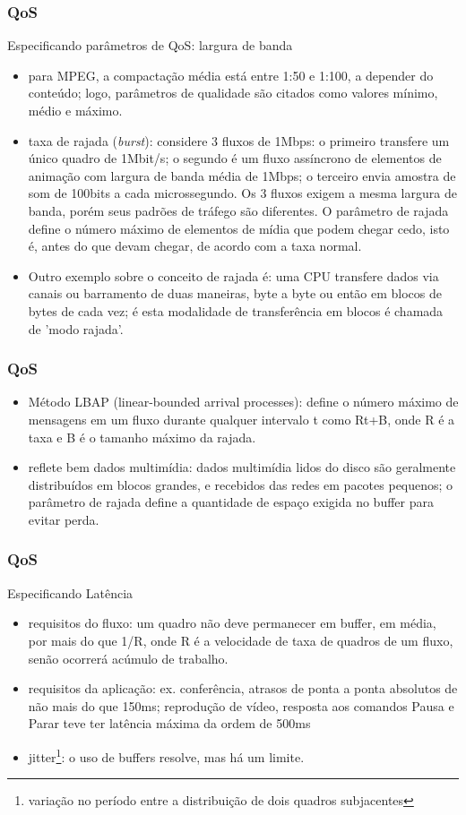 \documentclass[]{beamer}
\begin{document}
\begin{frame}[allowframebreaks]
  \frametitle{QoS}
Especificando parâmetros de QoS: largura de banda
\begin{itemize}
  \item  para MPEG, a compactação média está entre 1:50 e 1:100, a depender
do conteúdo; logo, parâmetros de qualidade são 
citados como valores mínimo, médio e máximo.
  \item taxa de rajada 
(\emph{burst}): considere 3 fluxos de 1Mbps: o primeiro 
transfere um único quadro de 1Mbit/s;
o segundo é um fluxo assíncrono de elementos de animação
com largura de banda média de 1Mbps; o terceiro envia amostra de 
som de 100bits a cada microssegundo. 
Os 3 fluxos exigem a mesma largura de banda, porém
seus padrões de tráfego são diferentes. 
O parâmetro de rajada define o número máximo de 
elementos de mídia que podem chegar cedo, 
isto é, antes do que devam chegar, de acordo
com a taxa normal.
 \item Outro exemplo sobre o conceito de rajada é: 
 uma CPU transfere dados via canais ou barramento 
de duas maneiras, byte a byte ou então em blocos de bytes de cada vez; 
é esta modalidade de transferência em blocos é 
chamada de 'modo rajada'.\cite{site1:2011}
\end{itemize}
\end{frame}


\begin{frame}
  \frametitle{QoS}
\begin{itemize}
  \item %
Método LBAP (linear-bounded arrival processes): 
define o número máximo de mensagens em um fluxo durante qualquer intervalo t como Rt+B,
onde R é a taxa e B é o tamanho máximo da rajada.
  \item reflete bem dados multimídia: dados multimídia lidos do disco são geralmente 
distribuídos em blocos grandes,
e recebidos das redes em pacotes pequenos; o parâmetro de rajada define a quantidade de
espaço exigida no buffer para evitar perda.
\end{itemize}
\end{frame}

\begin{frame}
  \frametitle{QoS}
Especificando Latência
\begin{itemize}
  \item requisitos do fluxo: um quadro não deve permanecer em buffer, 
em média, por mais do que 1/R,
onde R é a velocidade de taxa de quadros de um fluxo,
 senão ocorrerá acúmulo de trabalho. 
  \item requisitos da aplicação: ex. conferência, atrasos 
de ponta a ponta absolutos de não
mais do que 150ms; reprodução de vídeo, resposta aos comandos
 Pausa e Parar teve ter latência
máxima da ordem de 500ms
  \item jitter\footnote{variação no período entre a
 distribuição de dois quadros subjacentes}: o
uso de buffers resolve, mas há um limite. 
\end{itemize}
\end{frame}
\end{document}
